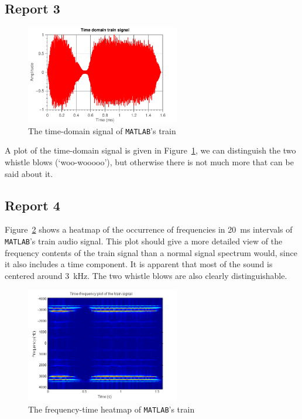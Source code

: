 \documentclass[11pt,titlepage]{report}
\begin{document}
\subsection{Report 3}

\begin{figure}[H]
	\centering
	\includegraphics[width=0.6\textwidth]{resource/ass-1-report-3.pdf}
	\caption{The time-domain signal of \texttt{MATLAB}'s train}
	\label{fig:rep3-train-time}
\end{figure}

A plot of the time-domain signal is given in Figure~\ref{fig:rep3-train-time}, we can distinguish the two whistle blows (`woo-wooooo'), but otherwise there is not much more that can be said about it.

\subsection{Report 4}
Figure~\ref{fig:rep4-train-heatmap} shows a heatmap of the occurrence of frequencies in \SI{20}{\milli\second} intervals of \texttt{MATLAB}'s train audio signal. This plot should give a more detailed view of the frequency contents of the train signal than a normal signal spectrum would, since it also includes a time component. It is apparent that most of the sound is centered around \SI{3}{\kilo\hertz}. The two whistle blows are also clearly distinguishable.

\begin{figure}[H]
	\centering
	\includegraphics[width=0.6\textwidth]{resource/ass-1-report-4.png}
	\caption{The frequency-time heatmap of \texttt{MATLAB}'s train}
	\label{fig:rep4-train-heatmap}
\end{figure}
\end{document}
